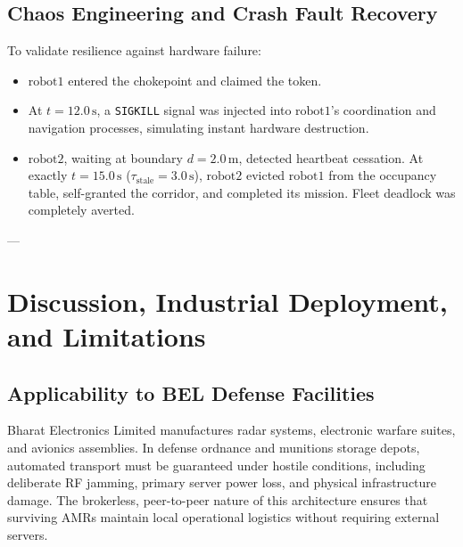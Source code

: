 \documentclass[10pt,twocolumn,a4paper]{article}
\theoremstyle{definition}
\begin{document}
\subsection{Chaos Engineering and Crash Fault Recovery}
To validate resilience against hardware failure:
\begin{itemize}
    \item $\text{robot1}$ entered the chokepoint and claimed the token.
    \item At $t = 12.0\,\text{s}$, a \texttt{SIGKILL} signal was injected into $\text{robot1}$'s coordination and navigation processes, simulating instant hardware destruction.
    \item $\text{robot2}$, waiting at boundary $d = 2.0\,\text{m}$, detected heartbeat cessation. At exactly $t = 15.0\,\text{s}$ ($\tau_{\text{stale}} = 3.0\,\text{s}$), $\text{robot2}$ evicted $\text{robot1}$ from the occupancy table, self-granted the corridor, and completed its mission. Fleet deadlock was completely averted.
\end{itemize}

---

\section{Discussion, Industrial Deployment, and Limitations}

\subsection{Applicability to BEL Defense Facilities}
Bharat Electronics Limited manufactures radar systems, electronic warfare suites, and avionics assemblies. In defense ordnance and munitions storage depots, automated transport must be guaranteed under hostile conditions, including deliberate RF jamming, primary server power loss, and physical infrastructure damage. The brokerless, peer-to-peer nature of this architecture ensures that surviving AMRs maintain local operational logistics without requiring external servers.
\end{document}
